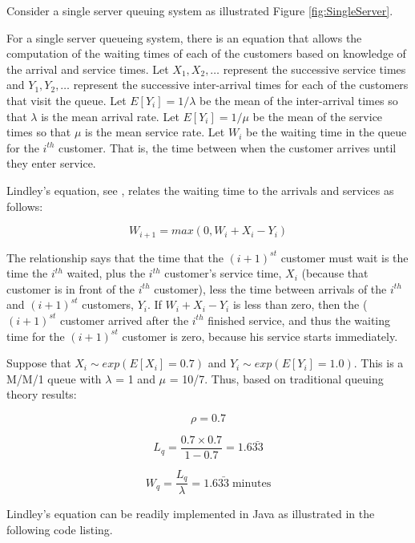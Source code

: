 \documentclass[
]{book}
\theoremstyle{definition}
\theoremstyle{definition}
\theoremstyle{definition}
\theoremstyle{definition}
\theoremstyle{remark}
\begin{document}
Consider a single server queuing system as illustrated Figure \ref{fig:SingleServer}.

For a single server queueing system, there is an equation that allows
the computation of the waiting times of each of the customers based on
knowledge of the arrival and service times. Let \(X_1, X_2, \ldots\)
represent the successive service times and \(Y_1, Y_2, \ldots\) represent
the successive inter-arrival times for each of the customers that visit
the queue. Let \(E[Y_i] = 1/\lambda\) be the mean of the inter-arrival
times so that \(\lambda\) is the mean arrival rate. Let \(E[Y_i] = 1/\mu\)
be the mean of the service times so that \(\mu\) is the mean service rate.
Let \(W_i\) be the waiting time in the queue for the \(i^{th}\) customer.
That is, the time between when the customer arrives until they enter
service.

Lindley's equation, see \citep{gross1998fundamentals}, relates the waiting
time to the arrivals and services as follows:

\[W_{i+1} = max(0, W_i + X_i - Y_i)\]

The relationship says that the time that the \((i + 1)^{st}\) customer
must wait is the time the \(i^{th}\) waited, plus the \(i^{th}\) customer's
service time, \(X_i\) (because that customer is in front of the \(i^{th}\)
customer), less the time between arrivals of the \(i^{th}\) and
\((i + 1)^{st}\) customers, \(Y_i\). If \(W_i + X_i - Y_i\) is less than zero,
then the (\((i + 1)^{st}\) customer arrived after the \(i^{th}\) finished
service, and thus the waiting time for the \((i + 1)^{st}\) customer is
zero, because his service starts immediately.

Suppose that \(X_i \sim exp(E[X_i] = 0.7)\) and
\(Y_i \sim exp(E[Y_i] = 1.0)\). This is a M/M/1 queue with \(\lambda\) = 1
and \(\mu\) = 10/7. Thus, based on traditional queuing theory results:

\[\rho = 0.7\]

\[L_q = \dfrac{0.7 \times 0.7}{1 - 0.7} = 1.6\bar{33}\]

\[W_q = \dfrac{L_q}{\lambda} = 1.6\bar{33} \; \text{minutes}\]

Lindley's equation can be readily implemented in Java as illustrated in the following code listing.
\end{document}
